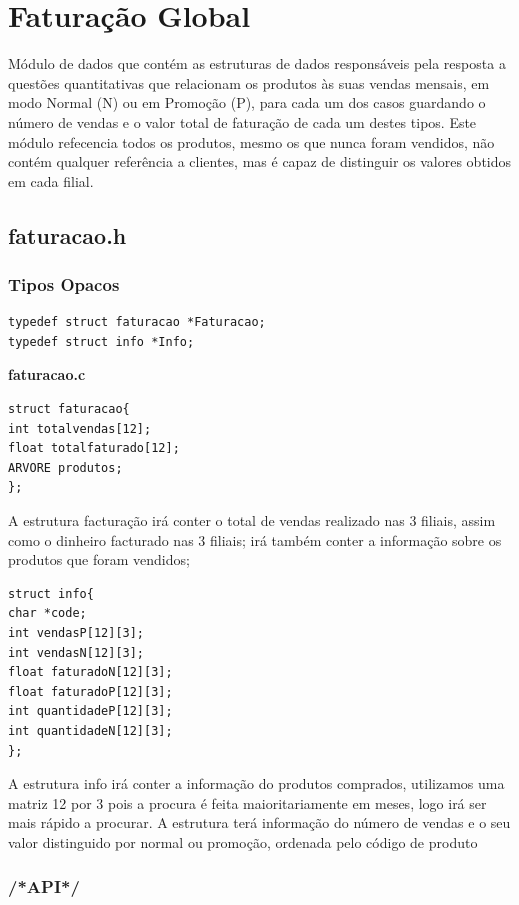\section{Faturação Global}

Módulo de dados que contém as estruturas de dados responsáveis pela resposta a questões quantitativas que relacionam os produtos às suas vendas mensais, em modo Normal (N) ou em Promoção (P), para cada um dos casos guardando o número de vendas e o valor total de faturação de cada um destes tipos. Este módulo refecencia todos os produtos, mesmo os que nunca foram vendidos, não contém qualquer referência a clientes, mas é capaz de distinguir os valores obtidos em cada filial. 

\subsection{faturacao.h}

\subsubsection{Tipos Opacos}
\begin{Verbatim}
typedef struct faturacao *Faturacao;
typedef struct info *Info;
\end{Verbatim}

\textbf{faturacao.c}
\begin{verbatim}
struct faturacao{
int totalvendas[12];
float totalfaturado[12];
ARVORE produtos;
};
\end{verbatim}

A estrutura facturação irá conter o total de vendas realizado nas 3 filiais, assim como o dinheiro facturado nas 3 filiais; irá também conter a informação sobre os produtos que foram vendidos; 

\begin{verbatim}
struct info{
char *code;
int vendasP[12][3];
int vendasN[12][3];
float faturadoN[12][3];
float faturadoP[12][3];
int quantidadeP[12][3];
int quantidadeN[12][3];
};
\end{verbatim}

A estrutura info irá conter a informação  do produtos comprados, utilizamos uma matriz 12 por 3 pois a procura é feita maioritariamente em meses, logo irá ser mais rápido a procurar. A estrutura terá informação do número de vendas e o seu valor distinguido por normal ou promoção, ordenada pelo código de produto

\subsubsection{/*API*/}

